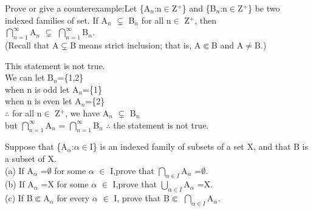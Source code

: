 \documentclass[11pt, a4paper, UTF8]{ctexart}
\begin{document}
\begin{problem}[UD:8.4]
Prove or give a counterexample:Let \{A$_n$:n$\in$Z$^+$\} and \{B$_n$:n$\in$Z$^+$\} be two indexed families of set. If A$_n$ $\subsetneq$ B$_n$ for all n$\in$ Z$^+$, then \\
\indent \indent $\bigcap_{n=1}^{\infty}$A$_n$ $\subsetneq$ $\bigcap_{n=1}^{\infty}$B$_n$.\\
(Recall that A$\subsetneq$B means strict inclusion; that is, A$\Subset$B and A$\not=$B.)
\end{problem}

\begin{solution}
This statement is not true.\\
We can let B$_n$=\{1,2\}\\
when n is odd let A$_n$=\{1\}\\
when n is even let A$_n$=\{2\}\\
$\therefore$ for all n$\in$ Z$^+$, we have A$_n$ $\subsetneq$ B$_n$\\
but $\bigcap_{n=1}^{\infty}$A$_n$ = $\bigcap_{n=1}^{\infty}$B$_n$
$\therefore$ the statement is not true.\\
\end{solution}










\begin{problem}[UD:8.7]
Suppose that \{A$_\alpha$:$\alpha$$\in$I\} is an indexed family of subsets of a set X, and that B is a subset of X.\\
(a) If A$_\alpha$ =$\emptyset$ for some $\alpha$ $\in$ I,prove that $\bigcap_{\alpha \in I}$A$_\alpha$ =$\emptyset$.\\
(b) If A$_\alpha$ =X for some $\alpha$ $\in$ I,prove that $\bigcup_{\alpha \in I}$A$_\alpha$ =X.\\
(c) If B$\Subset$A$_\alpha$ for every $\alpha$ $\in$ I, prove that B$\Subset$ $\bigcap_{\alpha \in I}$A$_\alpha$.\\
\end{problem}
\end{document}
